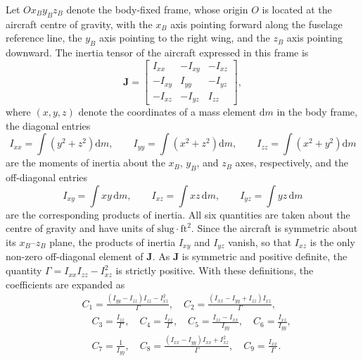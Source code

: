 \documentclass[pdflatex,sn-mathphys-num]{sn-jnl}%
\theoremstyle{thmstyleone}%
\theoremstyle{thmstyletwo}%
\theoremstyle{thmstylethree}%
\begin{document}
Let $Ox_By_Bz_B$ denote the body-fixed frame, whose origin $O$ is located at the aircraft centre of gravity, with the $x_B$ axis pointing forward along the fuselage reference line, the $y_B$ axis pointing to the right wing, and the $z_B$ axis pointing downward. The inertia tensor of the aircraft expressed in this frame is
\begin{equation}
    \mathbf{J} =
    \begin{bmatrix}
         I_{xx} & -I_{xy} & -I_{xz} \\[2pt]
        -I_{xy} &  I_{yy} & -I_{yz} \\[2pt]
        -I_{xz} & -I_{yz} &  I_{zz}
    \end{bmatrix},
    \label{eq:inertia_tensor}
\end{equation}
where $(x,y,z)$ denote the coordinates of a mass element $\mathrm{d}m$ in the body frame, the diagonal entries
\begin{equation}
    I_{xx} = \int \left(y^{2} + z^{2}\right) \mathrm{d}m, \qquad
    I_{yy} = \int \left(x^{2} + z^{2}\right) \mathrm{d}m, \qquad
    I_{zz} = \int \left(x^{2} + y^{2}\right) \mathrm{d}m
    \label{eq:moments_of_inertia}
\end{equation}
are the moments of inertia about the $x_B$, $y_B$, and $z_B$ axes, respectively, and the off-diagonal entries
\begin{equation}
    I_{xy} = \int xy \,\mathrm{d}m, \qquad
    I_{xz} = \int xz \,\mathrm{d}m, \qquad
    I_{yz} = \int yz \,\mathrm{d}m
    \label{eq:products_of_inertia}
\end{equation}
are the corresponding products of inertia. All six quantities are taken about the centre of gravity and have units of $\mathrm{slug}\cdot\mathrm{ft}^{2}$. Since the aircraft is symmetric about its $x_B$--$z_B$ plane, the products of inertia $I_{xy}$ and $I_{yz}$ vanish, so that $I_{xz}$ is the only non-zero off-diagonal element of $\mathbf{J}$. As $\mathbf{J}$ is symmetric and positive definite, the quantity $\Gamma = I_{xx}I_{zz} - I_{xz}^{2}$ is strictly positive. With these definitions, the coefficients are expanded as
\begin{equation}
    \begin{aligned}
        & C_1 = \frac{(I_{yy} - I_{zz})I_{zz} - I_{xz}^2}{\Gamma}, \quad C_2 = \frac{(I_{xx} - I_{yy} + I_{zz})I_{xz}}{\Gamma}, \\  
        & \quad C_3 = \frac{I_{zz}}{\Gamma}, \quad C_4 = \frac{I_{xz}}{\Gamma}, \quad
        C_5 = \frac{I_{zz} - I_{xx}}{I_{yy}}, \quad C_6 = \frac{I_{xz}}{I_{yy}}, \\
        &\quad C_7 = \frac{1}{I_{yy}}, \quad C_8 = \frac{(I_{xx} - I_{yy})I_{xx} + I_{xz}^2}{\Gamma}, \quad C_9 = \frac{I_{xx}}{\Gamma}.
    \end{aligned}
    \label{eq:inertia_coeffs}
\end{equation}
\end{document}

